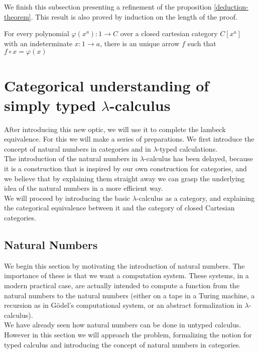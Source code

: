 We finish this subsection presenting a refinement of the proposition \ref{deduction-theorem}. This result is also proved by induction on the length of the proof.

\begin{proposition}
  For every polynomial $\varphi(x^a): 1\to C$ over a closed cartesian category $C[x^a]$ with an indeterminate $x:1\to a$, there is an unique arrow $f$ such that $f\circ x=\varphi(x)$
\end{proposition}

\section{Categorical understanding of simply typed $\lambda$-calculus}
After introducing this new optic, we will use it to complete the lambeck equivalence. For this we will make a series of preparations. We first introduce the concept of natural numbers in categories and in $\lambda$-typed calculations.\\

The introduction of the natural numbers in $\lambda$-calculus has been delayed, because it is a construction that is inspired by our own construction for categories, and we believe that by explaining them straight away we can grasp the underlying idea of the natural numbers in a more efficient way.\\

We will proceed by introducing the basic $\lambda$-calculus as a category, and explaining the categorical equivalence between it and the category of closed Cartesian categories.

\subsection{Natural Numbers}


We begin this section by motivating the introduction of natural numbers. The importance of these is that we want a computation system. These systems, in a modern practical case, are actually intended to compute a function from the natural numbers to the natural numbers (either on a tape in a Turing machine, a recursion as in Gödel's computational system, or an abstract formalization in $\lambda$-calculus).\\

We have already seen how natural numbers can be done in untyped calculus. However in this section we will approach the problem, formalizing the notion for typed calculus and introducing the concept of natural numbers in categories.

